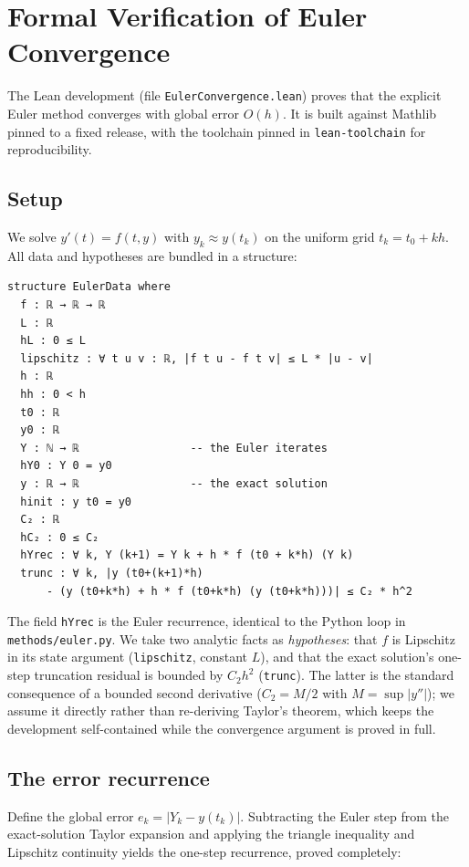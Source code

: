\documentclass[sigplan,nonacm,screen,review]{acmart}
\begin{document}
\section{Formal Verification of Euler Convergence}
\label{sec:lean}

The Lean development (file \texttt{EulerConvergence.lean}) proves that the
explicit Euler method converges with global error $O(h)$. It is built against
Mathlib pinned to a fixed release, with the toolchain pinned in
\texttt{lean-toolchain} for reproducibility.

\subsection{Setup}
We solve $y'(t) = f(t, y)$ with $y_k \approx y(t_k)$ on the uniform grid
$t_k = t_0 + kh$. All data and hypotheses are bundled in a structure:

\begin{lstlisting}[language=lean]
structure EulerData where
  f : ℝ → ℝ → ℝ
  L : ℝ
  hL : 0 ≤ L
  lipschitz : ∀ t u v : ℝ, |f t u - f t v| ≤ L * |u - v|
  h : ℝ
  hh : 0 < h
  t0 : ℝ
  y0 : ℝ
  Y : ℕ → ℝ                 -- the Euler iterates
  hY0 : Y 0 = y0
  y : ℝ → ℝ                 -- the exact solution
  hinit : y t0 = y0
  C₂ : ℝ
  hC₂ : 0 ≤ C₂
  hYrec : ∀ k, Y (k+1) = Y k + h * f (t0 + k*h) (Y k)
  trunc : ∀ k, |y (t0+(k+1)*h)
      - (y (t0+k*h) + h * f (t0+k*h) (y (t0+k*h)))| ≤ C₂ * h^2
\end{lstlisting}

The field \texttt{hYrec} is the Euler recurrence, identical to the Python loop in
\texttt{methods/euler.py}. We take two analytic facts as \emph{hypotheses}: that
$f$ is Lipschitz in its state argument (\texttt{lipschitz}, constant $L$), and
that the exact solution's one-step truncation residual is bounded by $C_2 h^2$
(\texttt{trunc}). The latter is the standard consequence of a bounded second
derivative ($C_2 = M/2$ with $M = \sup |y''|$); we assume it directly rather than
re-deriving Taylor's theorem, which keeps the development self-contained while the
convergence argument is proved in full.

\subsection{The error recurrence}
Define the global error $e_k = |Y_k - y(t_k)|$. Subtracting the Euler step from
the exact-solution Taylor expansion and applying the triangle inequality and
Lipschitz continuity yields the one-step recurrence, proved completely:
\end{document}
